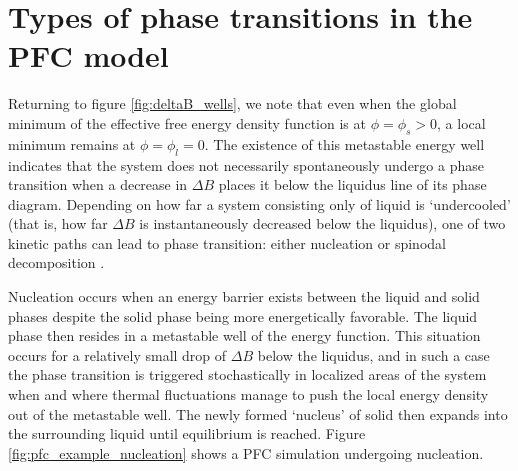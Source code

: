 
\section{Types of phase transitions in the PFC model}\label{sec:pfc_phasetrans}

Returning to figure \ref{fig:deltaB_wells}, we note that even when the global minimum of the effective free energy density function is at $\phi=\phi_s>0$, a local minimum remains at $\phi=\phi_l=0$. The existence of this metastable energy well indicates that the system does not necessarily spontaneously undergo a phase transition when a decrease in $\Delta B$ places it below the liquidus line of its phase diagram. Depending on how far a system consisting only of liquid is `undercooled' (that is, how far $\Delta B$ is instantaneously decreased below the liquidus), one of two kinetic paths can lead to phase transition: either nucleation or spinodal decomposition \cite{chaikin_condensed,provatas_PFC}.

Nucleation occurs when an energy barrier exists between the liquid and solid phases despite the solid phase being more energetically favorable. The liquid phase then resides in a metastable well of the energy function. This situation occurs for a relatively small drop of $\Delta B$ below the liquidus, and in such a case the phase transition is triggered stochastically in localized areas of the system when and where thermal fluctuations manage to push the local energy density out of the metastable well. The newly formed `nucleus' of solid then expands into the surrounding liquid until equilibrium is reached. Figure \ref{fig:pfc_example_nucleation} shows a PFC simulation undergoing nucleation.

